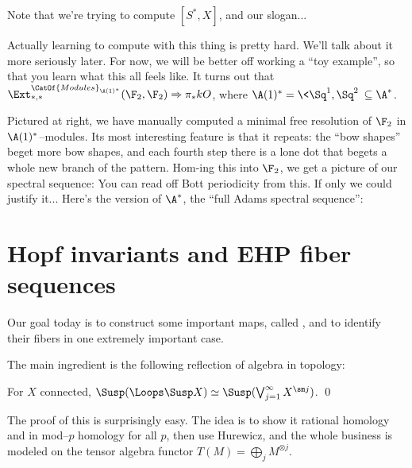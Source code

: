 \begin{remark}
Note that we're trying to compute $[S^*, X]$, and our slogan...
\end{remark}

Actually learning to compute with this thing is pretty hard.  We'll talk about it more seriously later.  For now, we will be better off working a ``toy example'', so that you learn what this all feels like.  It turns out that $\Ext^{\CatOf{Modules}_{\A(1)^*}}_{*, *}(\F_2, \F_2) \Rightarrow \pi_* kO$, where $\A(1)^* = \<\Sq^1, \Sq^2\> \subseteq \A^*$.

Pictured at right, we have manually computed a minimal free resolution of $\F_2$ in $\A(1)^*$--modules.  Its most interesting feature is that it repeats: the ``bow shapes'' beget more bow shapes, and each fourth step there is a lone dot that begets a whole new branch of the pattern.  Hom-ing this into $\F_2$, we get a picture of our spectral sequence:
You can read off Bott periodicity from this.  If only we could justify it... Here's the version of $\A^*$, the ``full Adams spectral sequence'':




\section{Hopf invariants and EHP fiber sequences}

Our goal today is to construct some important maps, called , and to identify their fibers in one extremely important case.

The main ingredient is the following reflection of algebra in topology:
\begin{theorem}[James]
For $X$ connected, $\Susp(\Loops \Susp X) \simeq \Susp(\bigvee_{j=1}^\infty X^{\sm j})$. \qed
\end{theorem}

The proof of this is surprisingly easy.  The idea is to show it rational homology and in mod--$p$ homology for all $p$, then use Hurewicz, and the whole business is modeled on the tensor algebra functor $T(M) = \bigoplus_j M^{\otimes j}$.

